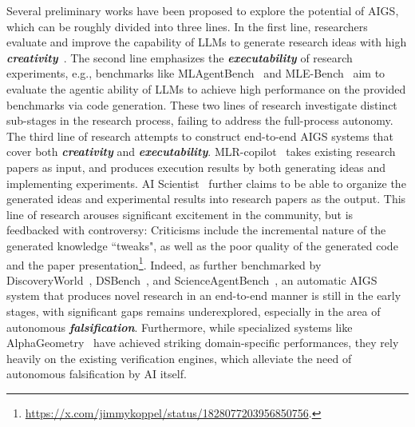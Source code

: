 \documentclass{article} %
\newcommand{\AIGS}{AIGS\xspace}
\begin{document}
 Several preliminary works have been proposed to explore the potential of \AIGS, which can be roughly divided into three lines. In the first line, researchers evaluate and improve the capability of LLMs to generate research ideas with high \textbf{\textit{creativity}}~\citep{si2024can,hu2024nova}. The second line emphasizes the \textbf{\textit{executability}} of research experiments, e.g., benchmarks like MLAgentBench~\citep{liu2023ml} and MLE-Bench~\citep{chan2024mle} aim to evaluate the agentic ability of LLMs to achieve high performance on the provided benchmarks via code generation. These two lines of research investigate distinct sub-stages in the research process, failing to address the full-process autonomy. The third line of research attempts to construct end-to-end \AIGS systems that cover both \textbf{\textit{creativity}} and \textbf{\textit{executability}}. MLR-copilot~\citep{li2024mlrcopilotautonomousmachinelearning} takes existing research papers as input, and produces execution results by both generating ideas and implementing experiments. AI Scientist~\citep{lu2024aiscientist} further claims to be able to organize the generated ideas and experimental results into research papers as the output. This line of research arouses significant excitement in the community, but is feedbacked with controversy: Criticisms include the incremental nature of the generated knowledge ``tweaks", as well as the poor quality of the generated code and the paper presentation\footnote{\url{https://x.com/jimmykoppel/status/1828077203956850756}.}. Indeed, as further benchmarked by DiscoveryWorld~\citep{jansen2024discoveryworld}, DSBench~\citep{jing2024dsbenchfardatascience}, and ScienceAgentBench~\citep{chen2024scienceagentbenchrigorousassessmentlanguage}, an automatic \AIGS system that produces novel research in an end-to-end manner is still in the early stages, with significant gaps remains underexplored, especially in the area of autonomous \textbf{\textit{falsification}}. Furthermore, while specialized systems like AlphaGeometry~\citep{trinh2024solving} have achieved striking domain-specific performances, they rely heavily on the existing verification engines, which alleviate the need of autonomous falsification by AI itself.
\end{document}
